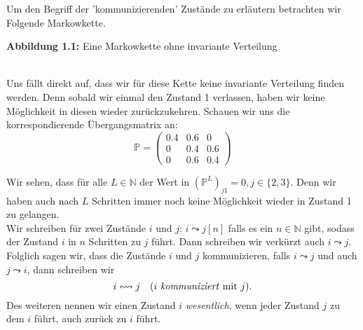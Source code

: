 \documentclass[a4paper]{article}
\begin{document}
Um den Begriff der 'kommunizierenden' Zustände zu erläutern betrachten wir Folgende Markowkette.

\begin{center}
\end{center}
\qquad \caption{\textbf{Abbildung 1.1:} Eine Markowkette ohne invariante Verteilung}
\\

Uns fällt direkt auf, dass wir für diese Kette keine invariante Verteilung finden werden. 
Denn sobald wir einmal den Zustand 1 verlassen, haben wir keine Möglichkeit in diesen wieder
zurückzukehren.
Schauen wir uns die korrespondierende Übergangsmatrix an:
\[
\mathbb{P} = \begin{pmatrix} 
	0.4 & 0.6 & 0 \\
	0 & 0.4 & 0.6 \\
	0 & 0.6 & 0.4
\end{pmatrix} 
\]

Wir sehen, dass für alle $L \in \mathbb{N}$ der Wert in $(\mathbb{P} ^{L}) _{j1} = 0, j \in \{
	2, 3
\} $. 
Denn wir haben auch nach $L$ Schritten immer noch keine Möglichkeit wieder in Zustand 1 zu gelangen.
\\

Wir schreiben für zwei Zustände $i$ und $j$: $i \leadsto j [n]$ falls es ein $n \in \mathbb{N}$ gibt, sodass
der Zustand $i$ in $n$ Schritten zu $j$ führt. Dann schreiben wir verkürzt auch $i \leadsto j$.
Folglich sagen wir, dass die Zustände $i$ und $j$ kommunizieren, falls $i \leadsto j$ und auch
$j \leadsto i$, dann schreiben wir
\[
	i \leftrightsquigarrow j \quad \text{($i$ \textit{kommuniziert} mit $j$)}.
\]
Des weiteren nennen wir einen Zustand $i$ \textit{wesentlich}, wenn jeder Zustand $j$ zu dem $i$ führt, auch
zurück zu $i$ führt. 
\end{document}
